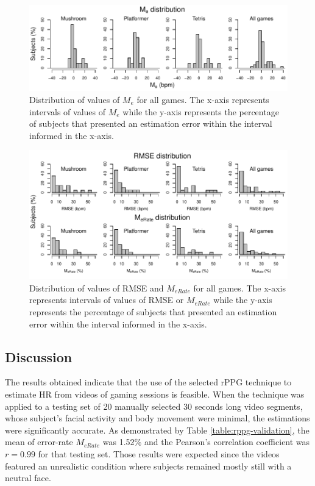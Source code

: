 \begin{figure}[!h]
\centering
\includegraphics[width=1.0\textwidth]{figures/hist-me.pdf}
\caption{Distribution of values of $M_e$ for all games. The x-axis represents intervals of values of $M_e$ while the y-axis represents the percentage of subjects that presented an estimation error within the interval informed in the x-axis.}
\label{fig:chart-hists-me}
\end{figure}

\begin{figure}[!h]
\centering
\includegraphics[width=1.0\textwidth]{figures/hist-rmse-mrate.pdf}
\caption{Distribution of values of RMSE and $M_{eRate}$ for all games. The x-axis represents intervals of values of RMSE or $M_{eRate}$ while the y-axis represents the percentage of subjects that presented an estimation error within the interval informed in the x-axis.}
\label{fig:chart-hists}
\end{figure}

\subsection{Discussion}

The results obtained indicate that the use of the selected rPPG technique to estimate HR from videos of gaming sessions is feasible. When the technique was applied to a testing set of 20 manually selected 30 seconds long video segments, whose subject's facial activity and body movement were minimal, the estimations were significantly accurate. As demonstrated by Table \ref{table:rppg-validation}, the mean of error-rate $M_{eRate}$ was 1.52\% and the Pearson's correlation coefficient was $r = 0.99$ for that testing set. Those results were expected since the videos featured an unrealistic condition where subjects remained mostly still with a neutral face.

